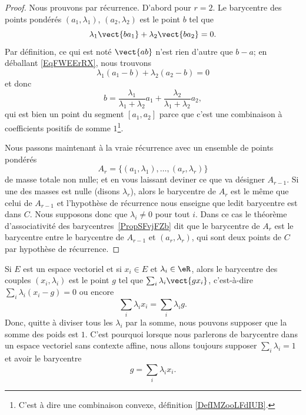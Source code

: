 \begin{proof}
	Nous prouvons par récurrence. D'abord pour \( r=2\). Le barycentre des points pondérés \( (a_1,\lambda_1)\), \( (a_2,\lambda_2)\) est le point \( b\) tel que
	\begin{equation}        \label{EqFWEErRX}
		\lambda_1\vect{ ba_1 }+\lambda_2\vect{ ba_2 }=0.
	\end{equation}
	Par définition, ce qui est noté \( \vect{ ab }\) n'est rien d'autre que \( b-a\); en déballant \eqref{EqFWEErRX}, nous trouvons
	\begin{equation}
		\lambda_1(a_1-b)+\lambda_2(a_2-b)=0
	\end{equation}
	et donc
	\begin{equation}
		b=\frac{ \lambda_1 }{ \lambda_1+\lambda_2 }a_1+\frac{ \lambda_2 }{ \lambda_1+\lambda_2 }a_2,
	\end{equation}
	qui est bien un point du segment \( [a_1,a_2]\) parce que c'est une combinaison à coefficients positifs de somme \( 1\)\footnote{C'est à dire une combinaison convexe, définition \ref{DefIMZooLFdIUB}.}.

	Nous passons maintenant à la vraie récurrence avec un ensemble de points pondérés
	\begin{equation}
		A_r=\{ (a_1,\lambda_1),\ldots, (a_r,\lambda_r) \}
	\end{equation}
	de masse totale non nulle; et en vous laissant deviner ce que va désigner \( A_{r-1}\). Si une des masses est nulle (disons \( \lambda_r\)), alors le barycentre de \( A_r\) est le même que celui de \( A_{r-1}\) et l'hypothèse de récurrence nous enseigne que ledit barycentre est dans \( C\). Nous supposons donc que \( \lambda_i\neq 0\) pour tout \( i\). Dans ce cas le théorème d'associativité des barycentres~\ref{PropSFvjFZb} dit que le barycentre de \( A_r\) est le barycentre entre le barycentre de \( A_{r-1}\) et \( (a_r,\lambda_r)\), qui sont deux points de \( C\) par hypothèse de récurrence.
\end{proof}

Si \( E\) est un espace vectoriel et si \( x_i\in E\) et \( \lambda_i\in \eR\), alors le barycentre des couples \( (x_i,\lambda_i)\) est le point \( g\) tel que \( \sum_i\lambda_i\vect{ gx_i }\), c'est-à-dire \( \sum_i\lambda_i(x_i-g)=0\) ou encore
\begin{equation}
	\sum_i\lambda_ix_i=\sum_i\lambda_ig.
\end{equation}
Donc, quitte à diviser tous les \( \lambda_i\) par la somme, nous pouvons supposer que la somme des poids est \( 1\). C'est pourquoi lorsque nous parlerons de barycentre dans un espace vectoriel sans contexte affine, nous allons toujours supposer \( \sum_i\lambda_i=1\) et avoir le barycentre
\begin{equation}
	g=\sum_i\lambda_ix_i.
\end{equation}

